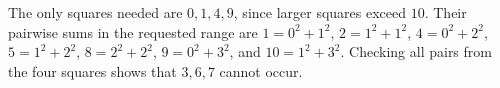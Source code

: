 The only squares needed are $0,1,4,9$, since larger squares exceed $10$. Their pairwise sums in the requested range are $1=0^2+1^2$, $2=1^2+1^2$, $4=0^2+2^2$, $5=1^2+2^2$, $8=2^2+2^2$, $9=0^2+3^2$, and $10=1^2+3^2$. Checking all pairs from the four squares shows that $3,6,7$ cannot occur.
